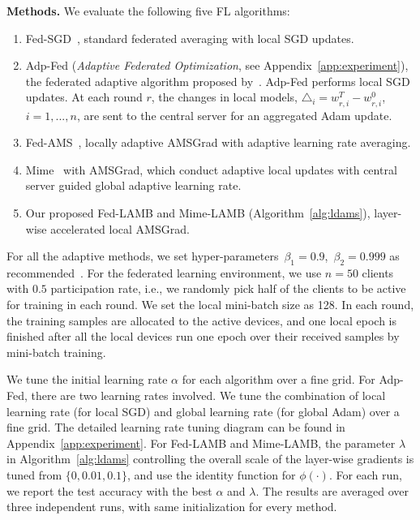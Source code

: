 \documentclass[nohyperref]{article}
\theoremstyle{plain}
\theoremstyle{definition}
\theoremstyle{remark}
\begin{document}
\noindent\textbf{Methods.} We evaluate the following five FL algorithms: 
\begin{enumerate}
    \item Fed-SGD~\citep{mcmahan2017communication}, standard federated averaging with local SGD updates.
    
    \item Adp-Fed (\emph{Adaptive Federated Optimization}, see Appendix~\ref{app:experiment}), the federated adaptive algorithm proposed by~\cite{reddi2020adaptive}. Adp-Fed performs local SGD updates. At each round $r$, the changes in local models, $\triangle_i=w_{r,i}^T-w_{r,i}^0$, $i=1,...,n$, are sent to the central server for an aggregated Adam update. 
    
    \item Fed-AMS~\citep{chen2020toward}, locally adaptive AMSGrad with adaptive learning rate averaging.
    
     \item Mime~\cite{karimireddy2020mime} with AMSGrad, which conduct adaptive local updates with central server guided global adaptive learning rate.
    
    \item Our proposed Fed-LAMB and Mime-LAMB (Algorithm~\ref{alg:ldams}), layer-wise accelerated local AMSGrad.
\end{enumerate}
For all the adaptive methods, we set hyper-parameters~$\beta_1=0.9$,~$\beta_2=0.999$ as recommended~\citep{reddi2019convergence}. For the federated learning environment, we use $n=50$ clients with $0.5$ participation rate, i.e., we randomly pick half of the clients to be active for training in each round. We set the local mini-batch size as 128. In each round, the training samples are allocated to the active devices, and one local epoch is finished after all the local devices run one epoch over their received samples by mini-batch training. 

We tune the initial learning rate $\alpha$ for each algorithm over a fine grid. For Adp-Fed, there are two learning rates involved. We tune the combination of local learning rate (for local SGD) and global learning rate (for global Adam) over a fine grid. The detailed learning rate tuning diagram can be found in Appendix~\ref{app:experiment}. For Fed-LAMB and Mime-LAMB, the parameter $\lambda$ in Algorithm~\ref{alg:ldams} controlling the overall scale of the layer-wise gradients is tuned from $\{0,0.01,0.1\}$, and use the identity function for $\phi(\cdot)$.
For each run, we report the test accuracy with the best $\alpha$ and $\lambda$. 
The results are averaged over three independent runs, with same initialization for every method.
\end{document}
